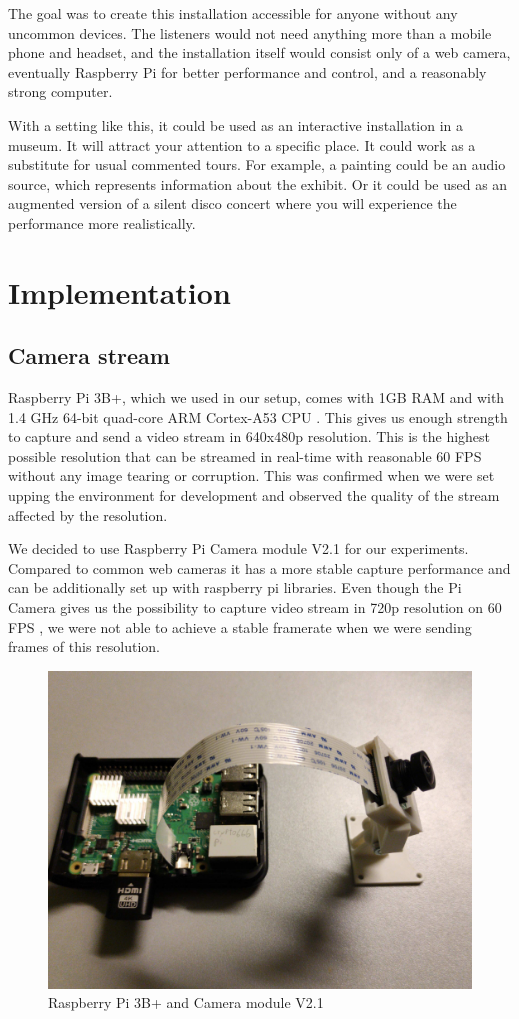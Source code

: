 \documentclass{ctuthesis}
\begin{document}
The goal was to create this installation accessible for anyone without any uncommon devices. The listeners would not need anything more than a mobile phone and headset, and the installation itself would consist only of a web camera, eventually Raspberry Pi for better performance and control, and a reasonably strong computer. 

With a setting like this, it could be used as an interactive installation in a museum. It will attract your attention to a specific place. It could work as a substitute for usual commented tours. For example, a painting could be an audio source, which represents information about the exhibit. 
Or it could be used as an augmented version of a silent disco concert where you will experience the performance more realistically.




\chapter{Implementation}
\section{Camera stream} \label {camera}
Raspberry Pi 3B+, which we used in our setup, comes with 1GB RAM and with 1.4 GHz 64-bit quad-core ARM Cortex-A53 CPU \cite{1}. This gives us enough strength to capture and send a video stream in 640x480p resolution. This is the highest possible resolution that can be streamed in real-time with reasonable 60 FPS without any image tearing or corruption. This was confirmed when we were set upping the environment for development and observed the quality of the stream affected by the resolution.

We decided to use Raspberry Pi Camera module V2.1 for our experiments. Compared to common web cameras it has a more stable capture performance and can be additionally set up with raspberry pi libraries. Even though the Pi Camera gives us the possibility to capture video stream in 720p resolution on 60 FPS \cite{2}, we were not able to achieve a stable framerate when we were sending frames of this resolution.

\begin{figure}[H]
	\centering
	\includegraphics[width=0.8\linewidth]{rPi.jpeg}
	\caption{Raspberry Pi 3B+ and Camera module V2.1}
	\label{fig:raspberry}
\end{figure}
\end{document}
